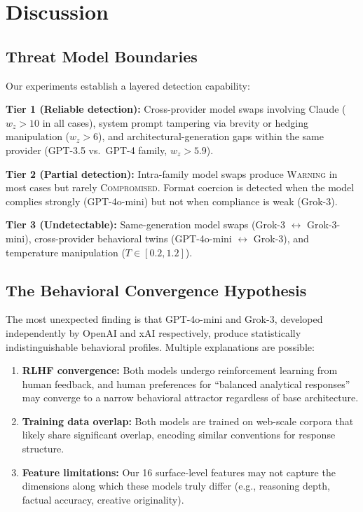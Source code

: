 \documentclass[11pt,twocolumn]{article}
\begin{document}
\section{Discussion}
\label{sec:discussion}

\subsection{Threat Model Boundaries}

Our experiments establish a layered detection capability:

\textbf{Tier 1 (Reliable detection):}
Cross-provider model swaps involving Claude ($w_z > 10$ in all cases), system prompt tampering via brevity or hedging manipulation ($w_z > 6$), and architectural-generation gaps within the same provider (GPT-3.5 vs.\ GPT-4 family, $w_z > 5.9$).

\textbf{Tier 2 (Partial detection):}
Intra-family model swaps produce \textsc{Warning} in most cases but rarely \textsc{Compromised}.
Format coercion is detected when the model complies strongly (GPT-4o-mini) but not when compliance is weak (Grok-3).

\textbf{Tier 3 (Undetectable):}
Same-generation model swaps (Grok-3 $\leftrightarrow$ Grok-3-mini), cross-provider behavioral twins (GPT-4o-mini $\leftrightarrow$ Grok-3), and temperature manipulation ($T \in [0.2, 1.2]$).

\subsection{The Behavioral Convergence Hypothesis}

The most unexpected finding is that GPT-4o-mini and Grok-3, developed independently by OpenAI and xAI respectively, produce statistically indistinguishable behavioral profiles.
Multiple explanations are possible:

\begin{enumerate}[nosep]
    \item \textbf{RLHF convergence:} Both models undergo reinforcement learning from human feedback, and human preferences for ``balanced analytical responses'' may converge to a narrow behavioral attractor regardless of base architecture.
    \item \textbf{Training data overlap:} Both models are trained on web-scale corpora that likely share significant overlap, encoding similar conventions for response structure.
    \item \textbf{Feature limitations:} Our 16 surface-level features may not capture the dimensions along which these models truly differ (e.g., reasoning depth, factual accuracy, creative originality).
\end{enumerate}
\end{document}

